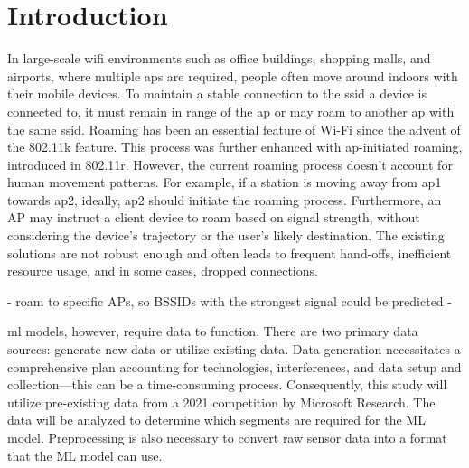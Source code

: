 \chapter{Introduction}\label{sec:intro}




In large-scale \ac{wifi} environments such as office buildings, shopping malls, and airports, where multiple \acp{ap} are required, people often move around indoors with their mobile devices.
To maintain a stable connection to the \ac{ssid} a device is connected to, it must remain in range of the \ac{ap} or may roam to another \ac{ap} with the same \ac{ssid}.
Roaming has been an essential feature of Wi-Fi since the advent of the 802.11k\cite{802.11k} feature.
This process was further enhanced with \ac{ap}-initiated roaming, introduced in 802.11r\cite{802.11r}.
However, the current roaming process doesn't account for human movement patterns. 
For example, if a station is moving away from \ac{ap}1 towards \ac{ap}2, ideally, \ac{ap}2 should initiate the roaming process.
Furthermore, an AP may instruct a client device to roam based on signal strength, without considering the device's trajectory or the user's likely destination.
The existing solutions are not robust enough and often leads to frequent hand-offs, inefficient resource usage, and in some cases, dropped connections.

- roam to specific APs, so BSSIDs with the strongest signal could be predicted
- 

\ac{ml} models, however, require data to function. 
There are two primary data sources: generate new data or utilize existing data. 
Data generation necessitates a comprehensive plan accounting for technologies, interferences, and data setup and collection—this can be a time-consuming process. 
Consequently, this study will utilize pre-existing data from a 2021 competition by Microsoft Research\cite{IndoorLocationNavigation}. 
The data will be analyzed to determine which segments are required for the ML model. 
Preprocessing is also necessary to convert raw sensor data into a format that the ML model can use.

